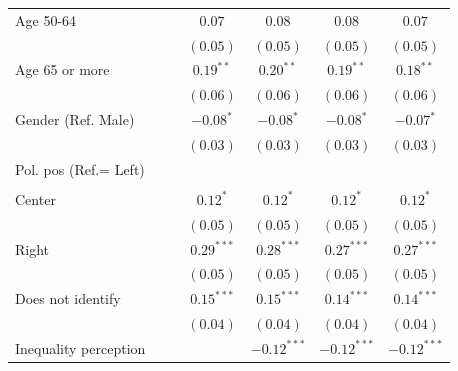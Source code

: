 \documentclass[
  12pt,
  a4paper,
]{article}
\begin{document}
\begin{table}[!ht]
\begin{center}
{\begin{tabular}{l c c c c c c}
\quad Age 50-64                     &               &               & $0.07$        & $0.08$        & $0.08$        & $0.07$        \\
                                    &               &               & $(0.05)$      & $(0.05)$      & $(0.05)$      & $(0.05)$      \\
\quad Age 65 or more                &               &               & $0.19^{**}$   & $0.20^{**}$   & $0.19^{**}$   & $0.18^{**}$   \\
                                    &               &               & $(0.06)$      & $(0.06)$      & $(0.06)$      & $(0.06)$      \\
Gender (Ref. Male)                  &               &               & $-0.08^{*}$   & $-0.08^{*}$   & $-0.08^{*}$   & $-0.07^{*}$   \\
                                    &               &               & $(0.03)$      & $(0.03)$      & $(0.03)$      & $(0.03)$      \\
Pol. pos (Ref.= Left)               &               &               &               &               &               &               \\
                                    &               &               &               &               &               &               \\
\quad Center                        &               &               & $0.12^{*}$    & $0.12^{*}$    & $0.12^{*}$    & $0.12^{*}$    \\
                                    &               &               & $(0.05)$      & $(0.05)$      & $(0.05)$      & $(0.05)$      \\
\quad Right                         &               &               & $0.29^{***}$  & $0.28^{***}$  & $0.27^{***}$  & $0.27^{***}$  \\
                                    &               &               & $(0.05)$      & $(0.05)$      & $(0.05)$      & $(0.05)$      \\
\quad Does not identify             &               &               & $0.15^{***}$  & $0.15^{***}$  & $0.14^{***}$  & $0.14^{***}$  \\
                                    &               &               & $(0.04)$      & $(0.04)$      & $(0.04)$      & $(0.04)$      \\
Inequality perception               &               &               &               & $-0.12^{***}$ & $-0.12^{***}$ & $-0.12^{***}$ \\

\end{tabular}}
\end{center}
\end{table}
\end{document}
